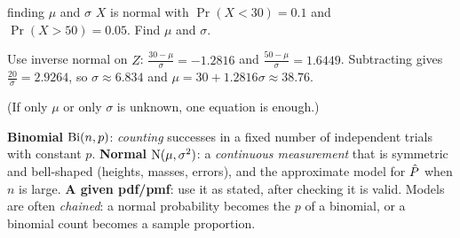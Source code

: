 \begin{example}{finding $\mu$ and $\sigma$ \examtwo}
$X$ is normal with $\Pr(X<30)=0.1$ and $\Pr(X>50)=0.05$. Find $\mu$ and $\sigma$.\par
Use inverse normal on $Z$: $\frac{30-\mu}{\sigma}=-1.2816$ and $\frac{50-\mu}{\sigma}=1.6449$. Subtracting gives $\frac{20}{\sigma}=2.9264$, so $\sigma\approx6.834$ and $\mu=30+1.2816\sigma\approx38.76$.\par
(If only $\mu$ or only $\sigma$ is unknown, one equation is enough.)
\end{example}

\begin{tip}
\textbf{Binomial} $\mathrm{Bi}(n,p)$: \emph{counting} successes in a fixed number of independent trials with constant $p$. \textbf{Normal} $\mathrm{N}(\mu,\sigma^2)$: a \emph{continuous measurement} that is symmetric and bell-shaped (heights, masses, errors), and the approximate model for $\hat{P}$ when $n$ is large. \textbf{A given pdf/pmf}: use it as stated, after checking it is valid. Models are often \emph{chained}: a normal probability becomes the $p$ of a binomial, or a binomial count becomes a sample proportion.
\end{tip}
